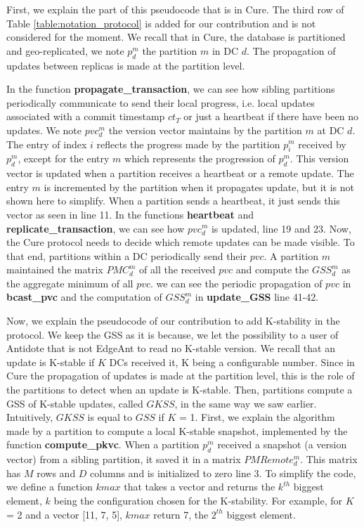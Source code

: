 \documentclass[11pt]{article}
\begin{document}
First, we explain the part of this pseudocode that is in Cure. The third row
of Table \ref{table:notation_protocol} is added for our contribution and is
not considered for the moment. We recall that in Cure, the database is
partitioned and geo-replicated, we note $p_d^m$ the partition $m$ in DC $d$.
The propagation of updates between replicas is made at the partition level.

In the function \textbf{propagate\_transaction}, we can see how sibling
partitions periodically communicate to send their local progress, i.e. local
updates associated with a commit timestamp $ct_T$ or just a heartbeat if there
have been no updates. We note $pvc_d^m$ the version vector maintains by the
partition $m$ at DC $d$. The entry of index $i$ reflects the progress made by
the partition $p_i^m$ received by $p_d^m$, except for the entry $m$ which
represents the progression of $p_d^m$. This version vector is updated when a
partition receives a heartbeat or a remote update. The entry $m$ is
incremented by the partition when it propagates update, but it is not shown
here to simplify. When a partition sends a heartbeat, it just sends this
vector as seen in line 11. In the functions \textbf{heartbeat} and
\textbf{replicate\_transaction}, we can see how $pvc_d^m$ is updated, line 19
and 23. Now, the Cure protocol needs to decide which remote updates can be
made visible. To that end, partitions within a DC periodically send their
$pvc$. A partition $m$ maintained the matrix $PMC_d^m$ of all the received
$pvc$ and compute the $GSS_d^m$ as the aggregate minimum of all $pvc$. we can
see the periodic propagation of $pvc$ in \textbf{bcast\_pvc} and the
computation of $GSS_d^m$ in \textbf{update\_GSS} line 41-42.

Now, we explain the pseudocode of our contribution to add K-stability in the
protocol. We keep the GSS as it is because, we let the possibility to a user
of Antidote that is not EdgeAnt to read no K-stable version. We recall that an
update is K-stable if $K$ DCs received it, K being a configurable number.
Since in Cure the propagation of updates is made at the partition level, this
is the role of the partitions to detect when an update is K-stable. Then,
partitions compute a GSS of K-stable updates, called $GKSS$, in the same way
we saw earlier. Intuitively, $GKSS$ is equal to $GSS$ if $K$ = 1. First, we
explain the algorithm made by a partition to compute a local K-stable
snapshot, implemented by the function \textbf{compute\_pkvc}. When a partition
$p_d^m$ received a snapshot (a version vector) from a sibling partition, it
saved it in a matrix $PMRemote_d^m$. This matrix has $M$ rows and $D$ columns
and is initialized to zero line 3. To simplify the code, we define a function
$kmax$ that takes a vector and returns the $k^{th}$ biggest element, $k$ being
the configuration chosen for the K-stability. For example, for $K$ = 2 and a
vector [11, 7, 5], $kmax$ return 7, the $2^{th}$ biggest element.
\end{document}
